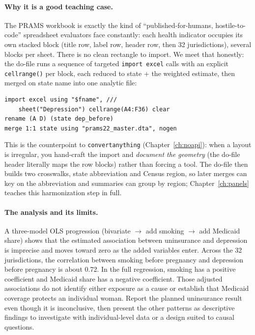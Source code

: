 \documentclass[
    a4paper,
    fontsize=10pt,
    twoside=true,
    numbers=noenddot,
]{kaobook}
\begin{document}
\paragraph{Why it is a good teaching case.} The PRAMS workbook is exactly the kind of \enquote{published-for-humans, hostile-to-code} spreadsheet evaluators face constantly: each health indicator occupies its own stacked block (title row, label row, header row, then 32 jurisdictions), several blocks per sheet. There is no clean rectangle to import. We meet that honestly: the do-file runs a sequence of targeted \texttt{import excel} calls with an explicit \texttt{cellrange()} per block, each reduced to state $+$ the weighted estimate, then merged on state name into one analytic file:
\par
{\footnotesize
\begin{verbatim}
import excel using "$fname", ///
    sheet("Depression") cellrange(A4:F36) clear
rename (A D) (state dep_before)
merge 1:1 state using "prams22_master.dta", nogen
\end{verbatim}
}
This is the counterpoint to \texttt{convertanything} (Chapter~\ref{ch:noapi}): when a layout is irregular, you hand-craft the import and \emph{document the geometry} (the do-file header literally maps the row blocks) rather than forcing a tool. The do-file then builds two crosswalks, state abbreviation and Census region, so later merges can key on the abbreviation and summaries can group by region; Chapter~\ref{ch:panels} teaches this harmonization step in full.

\paragraph{The analysis and its limits.} A three-model OLS progression (bivariate $\rightarrow$ add smoking $\rightarrow$ add Medicaid share) shows that the estimated association between uninsurance and depression is imprecise and moves toward zero as the added variables enter. Across the 32 jurisdictions, the correlation between smoking before pregnancy and depression before pregnancy is about 0.72. In the full regression, smoking has a positive coefficient and Medicaid share has a negative coefficient. Those adjusted associations do not identify either exposure as a cause or establish that Medicaid coverage protects an individual woman. Report the planned uninsurance result even though it is inconclusive, then present the other patterns as descriptive findings to investigate with individual-level data or a design suited to causal questions.
\end{document}

